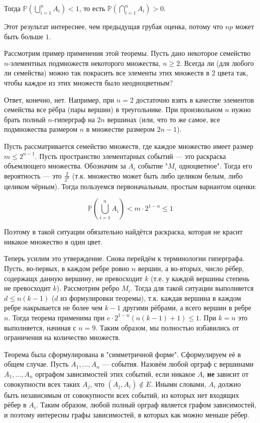 \documentclass[12pt]{article}
\renewcommand{\P}{\mathbb{P}}
\begin{document}
Тогда $\P \left(\bigcup_{i=1}^n A_i \right) < 1$, то есть $\P \left(\bigcap_{i=1}^n A_i \right) > 0$.

Этот результат интереснее, чем предыдущая грубая оценка, потому что $np$ может быть больше $1$.

Рассмотрим пример применения этой теоремы. Пусть дано некоторое семейство $n$-элементных подмножеств некоторого множества, $n \geq 2$. Всегда ли (для любого ли семейства) можно так покрасить все элементы этих множеств в 2 цвета так, чтобы каждое из этих множеств было неодноцветным?

Ответ, конечно, нет. Например, при $n = 2$ достаточно взять в качестве элементов семейства все рёбра (пары вершин) в треугольнике. При произвольном $n$ нужно брать полный $n$-гиперграф на $2n$ вершинах (или, что то же самое, все подмножества размером $n$ в множестве размером $2n-1$).

Пусть рассматривается семейство множеств, где каждое множество имеет размер $m \leq 2^{n-1}$. Пусть пространство элементарных событий — это раскраска объемлющего множества. Обозначим за $A_i$ событие "$M_i$ одноцветное". Тогда его вероятность — это $\frac 2 {2^n}$ (т.к. множество может быть либо целиком белым, либо целиком чёрным). Тогда пользуемся первоначальным, простым вариантом оценки:

\[
\P \left( \bigcup_{i=1}^n A_i \right) < m \cdot 2^{1-n} \leq 1
\]

Поэтому в такой ситуации обязательно найдётся раскраска, которая не красит никакое множество в один цвет.

Теперь усилим это утверждение. Снова перейдём к терминологии гиперграфа. Пусть, во-первых, в каждом ребре ровно $n$ вершин, а во-вторых, число рёбер, содержащх данную вершину, не превосходит $k$ (т.е. у каждой вершины степень не превосходит $k$). Рассмотрим ребро $M_i$. Тогда для такой ситуации выполняется $d \leq n(k-1)$ ($d$ из формулировки теоремы), т.к. каждая вершина в каждом ребре накрывается не более чем $k-1$ другими рёбрами, а всего вершин в ребре $n$. Тогда теорема применима при $e \cdot 2^{1-n}(n(k-1)+1) \leq 1$. При $k=n$ это выполняется, начиная с $n = 9$. Таким образом, мы полностью избавились от ограничения на количество множеств.

Теорема была сформулирована в "симметричной форме". Сформулируем её в общем случае. Пусть $A_1, \ldots, A_n$ — события. Назовём любой орграф с вершинами $A_1, \ldots, A_n$ орграфом зависимостей этих событий, если никакое $A_i$ \textbf{не} зависит от совокупности всех таких $A_j$, что $(A_j, A_i) \not\in E$. Иными словами, $A_i$ должно быть независимым от совокупности всех событий, из которых нет входящих рёбер в $A_i$. Таким образом, любой полный орграф является графом зависимостей, и поэтому интересны графы зависимостей, в которых как можно меньше рёбер.
\end{document}
